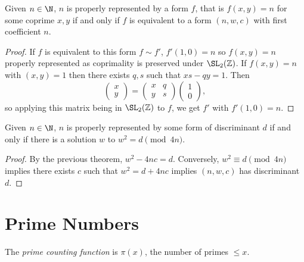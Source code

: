 \documentclass[a4paper, 10pt]{amsart}
\begin{document}

\begin{theorem}
    Given $n \in \N$, $n$ is properly represented by a form $f$, that is $f(x,y) = n$ for some coprime $x, y$
if and only if $f$ is equivalent to a form $(n, w, c)$ with first coefficient $n$.
    \end{theorem} 
\begin{proof}
    If $f$ is equivalent to this form $f \sim f'$, $f'(1, 0) = n$ so $f(x, y) = n$ properly represented as coprimality is preserved under $\SL_2(\mathbb{Z})$. 
    If $f(x, y) = n$ with $(x, y) = 1$ then there exists $q, s$ such that $xs - qy = 1$. Then
    $$
    \begin{pmatrix}
        x \\ y
    \end{pmatrix} = \begin{pmatrix}
        x & q \\ y & s
    \end{pmatrix} \begin{pmatrix}
        1 \\ 0
    \end{pmatrix},
    $$ 
    so applying this matrix being in $\SL_2(\mathbb{Z})$ to $f$, we get $f'$ with $f'(1, 0) = n$.
\end{proof}

\begin{theorem}
    Given $n \in \N$, $n$ is properly represented by some form of discriminant $d$ if and only if there is a solution $w$ to $w^2 = d\pmod{4n}$. 
\end{theorem}
\begin{proof}
    By the previous theorem, $w^2 - 4nc = d$. Conversely, $w^2 \equiv d\pmod{4n}$ implies there exists $c$ such that $w^2 = d + 4nc$ implies $(n, w, c)$ has discriminant $d$.
\end{proof}


\section{Prime Numbers}

\begin{definition}
The \emph{prime counting function} is $\pi(x)$, the number of primes $\leq x$.
\end{definition}
\end{document}

